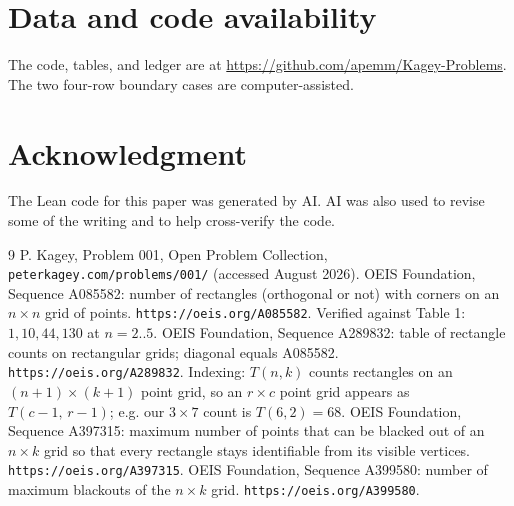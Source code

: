 \documentclass[12pt]{article}
\theoremstyle{definition}\newtheorem{definition}{Definition}
\theoremstyle{remark}\newtheorem{remark}{Remark}
\begin{document}
\section*{Data and code availability}
The code, tables, and ledger are at
\url{https://github.com/apemm/Kagey-Problems}.
The two four-row boundary cases are computer-assisted.

\section*{Acknowledgment}
The Lean code for this paper was generated by AI. AI was also used to revise some of the
writing and to help cross-verify the code.

\clearpage
\begin{thebibliography}{9}
 P. Kagey, Problem 001, Open Problem Collection,
\texttt{peterkagey.com/problems/001/} (accessed August 2026).
 OEIS Foundation, Sequence A085582: number of rectangles
(orthogonal or not) with corners on an $n\times n$ grid of points.
\texttt{https://oeis.org/A085582}. Verified against Table 1: $1,10,44,130$ at $n=2..5$.
 OEIS Foundation, Sequence A289832: table of rectangle counts
on rectangular grids; diagonal equals A085582. \texttt{https://oeis.org/A289832}.
Indexing: $T(n,k)$ counts rectangles on an $(n{+}1)\times(k{+}1)$ point grid, so an
$r\times c$ point grid appears as $T(c-1,\,r-1)$; e.g. our $3\times 7$ count is $T(6,2)=68$.
 OEIS Foundation, Sequence A397315: maximum number of points
that can be blacked out of an $n\times k$ grid so that every rectangle stays
identifiable from its visible vertices. \texttt{https://oeis.org/A397315}.
 OEIS Foundation, Sequence A399580: number of maximum
blackouts of the $n\times k$ grid. \texttt{https://oeis.org/A399580}.
\end{thebibliography}
\end{document}
